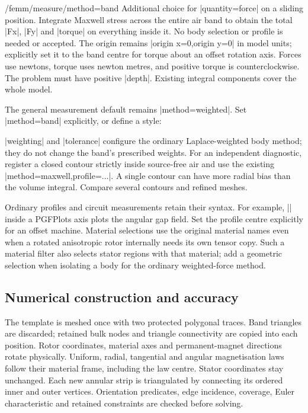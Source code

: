 \begin{key}{/femm/measure/method=band}
Additional choice for |quantity=force| on a sliding position. Integrate Maxwell
stress across the entire air band to obtain the total |Fx|, |Fy| and |torque|
on everything inside it. No body selection or profile is needed or accepted.
The origin remains |origin x=0,origin y=0| in model units; explicitly set it to
the band centre for torque about an offset rotation axis. Forces use newtons,
torque uses newton metres, and positive torque is counterclockwise. The problem
must have positive |depth|. Existing integral components cover the whole model.
\end{key}
The general measurement default remains |method=weighted|. Set |method=band|
explicitly, or define a style:
\begin{codeexample}
\femmmeasure[rotor torque,name=at-60,parameter=60]
\end{codeexample}
|weighting| and |tolerance| configure the ordinary Laplace-weighted body method;
they do not change the band's prescribed weights. For an independent diagnostic,
register a closed contour strictly inside source-free air and use the existing
|method=maxwell,profile=...|. A single contour can have more radial bias than
the volume integral. Compare several contours and refined meshes.

Ordinary profiles and circuit measurements retain their syntax. For example,
|\femmplot[profile=gap-30,component=By,abscissa=angle]| inside a PGFPlots axis
plots the angular gap field. Set the profile centre explicitly for an offset
machine. Material selections use the original material names even when a
rotated anisotropic rotor internally needs its own tensor copy. Such a material
filter also selects stator regions with that material; add a geometric selection
when isolating a body for the ordinary weighted-force method.

\subsection{Numerical construction and accuracy}
The template is meshed once with two protected polygonal traces. Band triangles
are discarded; retained bulk nodes and triangle connectivity are copied into
each position. Rotor coordinates, material axes and permanent-magnet directions
rotate physically. Uniform, radial, tangential and angular magnetisation laws
follow their material frame, including the law centre. Stator coordinates stay
unchanged. Each new annular strip is triangulated by connecting its ordered
inner and outer vertices. Orientation predicates, edge incidence, coverage,
Euler characteristic and retained constraints are checked before solving.

